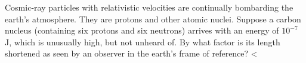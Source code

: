 Cosmic-ray particles with relativistic velocities are
continually bombarding the earth's atmosphere. They are
protons and other atomic nuclei. Suppose a carbon nucleus
(containing six protons and six neutrons) arrives with an
energy of $10^{-7}$ J, which is unusually high, but not unheard
of. By what factor is its length shortened as seen by an
observer in the earth's frame of reference?
<%
